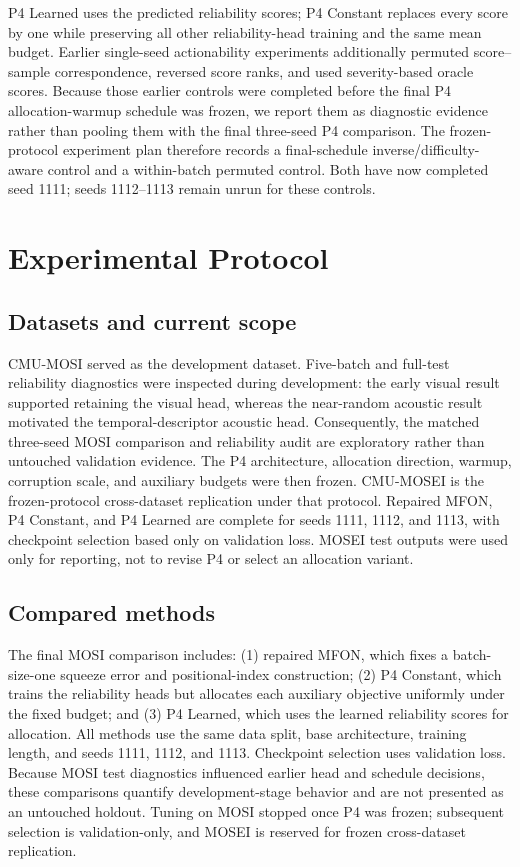 P4 Learned uses the predicted reliability scores; P4 Constant replaces
every score by one while preserving all other reliability-head training
and the same mean budget. Earlier single-seed actionability experiments
additionally permuted score--sample correspondence, reversed score
ranks, and used severity-based oracle scores. Because those earlier
controls were completed before the final P4 allocation-warmup schedule
was frozen, we report them as diagnostic evidence rather than pooling
them with the final three-seed P4 comparison. The frozen-protocol experiment
plan therefore records a final-schedule inverse/difficulty-aware control
and a within-batch permuted control. Both have now completed seed 1111;
seeds 1112--1113 remain unrun for these controls.

\section{Experimental Protocol}\label{experimental-protocol}

\subsection{Datasets and current
scope}\label{datasets-and-current-scope}

CMU-MOSI \cite{zadeh2016multimodal} served as the development dataset.
Five-batch and full-test reliability diagnostics were inspected during
development: the early visual result supported retaining the visual head,
whereas the near-random acoustic result motivated the temporal-descriptor
acoustic head. Consequently, the matched three-seed MOSI comparison and
reliability audit are exploratory rather than untouched validation
evidence. The P4 architecture, allocation direction, warmup, corruption
scale, and auxiliary budgets were then frozen. CMU-MOSEI
\cite{zadeh2018mosei} is the frozen-protocol cross-dataset replication under
that protocol. Repaired MFON, P4 Constant, and P4 Learned are complete for
seeds 1111, 1112, and 1113, with checkpoint selection based only on validation
loss. MOSEI test outputs were used only for reporting, not to revise P4 or
select an allocation variant.

\subsection{Compared methods}\label{compared-methods}

The final MOSI comparison includes: (1) repaired MFON, which fixes a
batch-size-one squeeze error and positional-index construction; (2) P4
Constant, which trains the reliability heads but allocates each
auxiliary objective uniformly under the fixed budget; and (3) P4
Learned, which uses the learned reliability scores for allocation. All
methods use the same data split, base architecture, training length, and
seeds 1111, 1112, and 1113. Checkpoint selection uses validation loss.
Because MOSI test diagnostics influenced earlier head and schedule
decisions, these comparisons quantify development-stage behavior and are
not presented as an untouched holdout. Tuning on MOSI stopped once P4 was
frozen; subsequent selection is validation-only, and MOSEI is reserved for
frozen cross-dataset replication.

